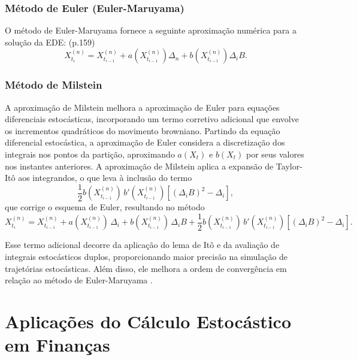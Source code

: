 \documentclass[12pt,openright,oneside,a4paper]{abntex2}
\numberwithin{equation}{section}
\begin{document}

\subsubsection{Método de Euler (Euler-Maruyama)}  

O método de Euler-Maruyama fornece a seguinte aproximação numérica para a solução da EDE: \textcite{Mikosh}(p.159)
\begin{equation}
    X_{t_{i}}^{(n)} = X_{t_{i-1}}^{(n)} + a(X_{t_{i-1}}^{(n)}) \Delta_n + b(X_{t_{i-1}}^{(n)}) \Delta_i B.
    \label{eq:euler}
\end{equation}  

\subsubsection{Método de Milstein}  

A aproximação de Milstein melhora a aproximação de Euler para equações diferenciais estocásticas, incorporando um termo corretivo adicional que envolve os incrementos quadráticos do movimento browniano. Partindo da equação diferencial estocástica, a aproximação de Euler considera a discretização dos integrais nos pontos da partição, aproximando $a(X_t)$ e $b(X_t)$ por seus valores nos instantes anteriores. A aproximação de Milstein aplica a expansão de Taylor-Itô aos integrandos, o que leva à inclusão do termo
\begin{equation}
\frac{1}{2} b(X_{t_{i-1}}^{(n)})\,b'(X_{t_{i-1}}^{(n)})\left[(\Delta_i B)^2 - \Delta_i\right], 
\end{equation}
que corrige o esquema de Euler, resultando no método
\begin{equation}
    X_{t_i}^{(n)} = X_{t_{i-1}}^{(n)} + a(X_{t_{i-1}}^{(n)})\,\Delta_i + b(X_{t_{i-1}}^{(n)})\,\Delta_i B 
+ \frac{1}{2} b(X_{t_{i-1}}^{(n)})\,b'(X_{t_{i-1}}^{(n)})\left[(\Delta_i B)^2 - \Delta_i\right]. 
 \label{eq:milstein}
\end{equation}

Esse termo adicional decorre da aplicação do lema de Itô e da avaliação de integrais estocásticos duplos, proporcionando maior precisão na simulação de trajetórias estocásticas. Além disso, ele melhora a ordem de convergência em relação ao método de Euler-Maruyama \parencite [p.~164] {Mikosh}. 


\section{Aplicações do Cálculo Estocástico em Finanças}
\end{document}
